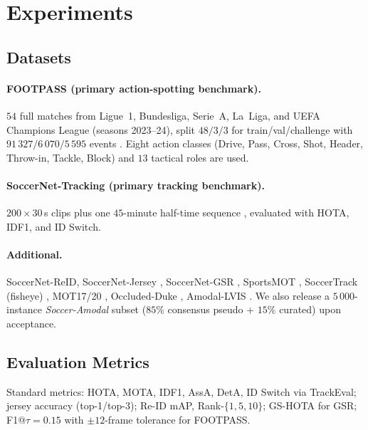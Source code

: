 \documentclass[conference]{IEEEtran}
\begin{document}
\section{Experiments}
\label{sec:exp}

\subsection{Datasets}
\label{sec:datasets}

\paragraph*{FOOTPASS (primary action-spotting benchmark).}
$54$ full matches from Ligue~1, Bundesliga, Serie~A, La~Liga, and UEFA Champions League (seasons 2023--24), split $48/3/3$ for train/val/challenge with $91\,327/6\,070/5\,595$ events \cite{footpass}. Eight action classes (Drive, Pass, Cross, Shot, Header, Throw-in, Tackle, Block) and $13$ tactical roles are used.

\paragraph*{SoccerNet-Tracking (primary tracking benchmark).}
$200\times 30$\,s clips plus one $45$-minute half-time sequence \cite{soccernettracking}, evaluated with HOTA, IDF1, and ID Switch.

\paragraph*{Additional.}
SoccerNet-ReID, SoccerNet-Jersey \cite{soccernetjersey}, SoccerNet-GSR \cite{somers2024gsr}, SportsMOT \cite{sportsmot}, SoccerTrack (fisheye) \cite{gtatrack}, MOT17/20 \cite{mot20}, Occluded-Duke \cite{pgfa}, Amodal-LVIS \cite{sameo}. We also release a $5\,000$-instance \emph{Soccer-Amodal} subset ($85\%$ consensus pseudo + $15\%$ curated) upon acceptance.

\subsection{Evaluation Metrics}
\label{sec:metrics}

Standard metrics: HOTA, MOTA, IDF1, AssA, DetA, ID Switch via TrackEval; jersey accuracy (top-1/top-3); Re-ID mAP, Rank-$\{1,5,10\}$; GS-HOTA for GSR; F1@$\tau=0.15$ with $\pm 12$-frame tolerance for FOOTPASS.
\end{document}
